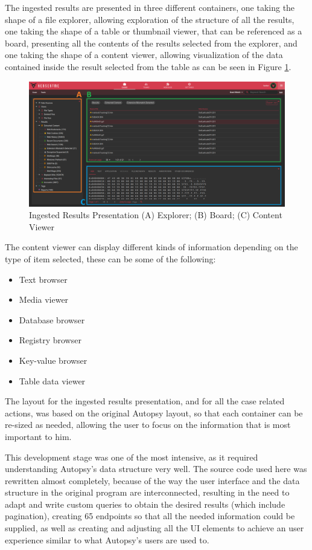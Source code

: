 The ingested results are presented in three different containers, one taking the shape of a file explorer, allowing exploration of the structure of all the results, 
one taking the shape of a table or thumbnail viewer, that can be referenced as a board, presenting all the contents of the results selected from the explorer, and one taking the shape of a content viewer, allowing visualization
of the data contained inside the result selected from the table as can be seen in Figure \ref{fig:data}.

\begin{figure}[ht]
 \centering
 \includegraphics[width=1\linewidth]{imgs/data.png}
 \caption{Ingested Results Presentation (A) Explorer; (B) Board; (C) Content Viewer}
 \label{fig:data}
\end{figure}

The content viewer can display different kinds of information depending on the type of item selected, these can be some of the following:
\begin{itemize}
 \item Text browser
 \item Media viewer
 \item Database browser
 \item Registry browser
 \item Key-value browser
 \item Table data viewer
\end{itemize}

The layout for the ingested results presentation, and for all the case related actions, was based on the original Autopsy layout, so that each container can be re-sized as
needed, allowing the user to focus on the information that is most important to him.

This development stage was one of the most intensive, as it required understanding Autopsy's data structure very well. The source code used here was rewritten almost completely, 
because of the way the user interface and the data structure in the original program are interconnected, resulting in the need to adapt and write custom queries to obtain the desired results (which include pagination), creating 
65 endpoints so that all the needed information could be supplied, as well as creating and adjusting all the UI elements to achieve an user experience similar to what Autopsy's users are used to.

